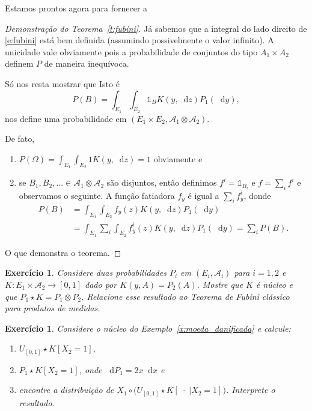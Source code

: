 \documentclass[reqno, final]{book}
\newcommand*\1{\mathds{1}}
\newtheorem{exercise}[example]{Exercício}
\renewcommand*\d{\mathop{}\!\mathrm{d}}
\begin{document}
Estamos prontos agora para fornecer a
\begin{proof}[Demonstração do Teorema~\ref{t:fubini}]
  Já sabemos que a integral do lado direito de \eqref{e:fubini} está bem definida (assumindo possivelmente o valor infinito).
  A unicidade vale obviamente pois a probabilidade de conjuntos do tipo $A_1 \times A_2$ definem $P$ de maneira inequívoca.


  Só nos resta mostrar que
  Isto é
  \begin{equation}
    P(B) = \int_{E_1} \int_{E_2} \1_{B} K(y, \d z) P_1 (\d y),
  \end{equation}
  nos define uma probabilidade em $(E_1 \times E_2, \mathcal{A}_1 \otimes \mathcal{A}_2)$.

  De fato,
  \begin{enumerate}[\quad a)]
  \item $P(\Omega) = \int_{E_1} \int_{E_2} 1 K(y, \d z) = 1$ obviamente e
  \item se $B_1, B_2, \dots \in \mathcal{A}_1 \otimes \mathcal{A}_2$ são disjuntos, então definimos $f^i = \1_{B_i}$ e $f = \sum_i f^i$ e observamos o seguinte.
    A função fatiadora $f_y$ é igual a $\sum_i f^i_y$, donde
    \begin{equation}
      \begin{split}
        P(B) & = \int_{E_1} \int_{E_2} f_y(z) K(y, \d z) P_1(\d y)\\
        & = \int_{E_1} \sum_i \int_{E_2} f^i_y(z) K(y, \d z) P_1(\d y) = \sum_i P(B).
      \end{split}
    \end{equation}
  \end{enumerate}
  O que demonstra o teorema.
\end{proof}

\begin{exercise}
  Considere duas probabilidades $P_i$ em $(E_i, \mathcal{A}_i)$ para $i = 1,2$ e $K:E_1 \times \mathcal{A}_2 \to [0,1]$ dado por $K(y,A) = P_2(A)$.
  Mostre que $K$ é núcleo e que $P_1 \star K = P_1 \otimes P_2$.
  Relacione esse resultado ao Teorema de Fubini clássico para produtos de medidas.
\end{exercise}

\begin{exercise}
  Considere o núcleo do Exemplo~\ref{x:moeda_danificada} e calcule:
  \begin{enumerate}[\quad a)]
  \item $U_{[0,1]} \star K [X_2 = 1]$,
  \item $P_1 \star K [X_2 = 1]$, onde $\d P_1 = 2x \d x$ e
  \item encontre a distribuição de $X_1 \circ \big( U_{[0,1]} \star K [\; \cdot \; | X_2 = 1] \big)$. Interprete o resultado.
  \end{enumerate}
\end{exercise}
\end{document}

